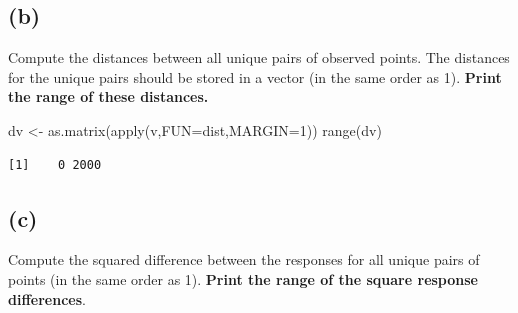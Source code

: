\documentclass[
  letterpaper,
  DIV=11,
  numbers=noendperiod]{scrartcl}
\newenvironment{Shaded}{\begin{snugshade}}{\end{snugshade}}
\newcommand{\AttributeTok}[1]{\textcolor[rgb]{0.40,0.45,0.13}{#1}}
\newcommand{\DecValTok}[1]{\textcolor[rgb]{0.68,0.00,0.00}{#1}}
\newcommand{\FunctionTok}[1]{\textcolor[rgb]{0.28,0.35,0.67}{#1}}
\newcommand{\NormalTok}[1]{\textcolor[rgb]{0.00,0.23,0.31}{#1}}
\newcommand{\OtherTok}[1]{\textcolor[rgb]{0.00,0.23,0.31}{#1}}
\begin{document}
\hypertarget{b-2}{%
\subsection{(b)}\label{b-2}}

Compute the distances between all unique pairs of observed points. The
distances for the unique pairs should be stored in a vector (in the same
order as 1). \textbf{Print the range of these distances.}

\begin{Shaded}
\begin{Highlighting}[]
\NormalTok{dv }\OtherTok{\textless{}{-}} \FunctionTok{as.matrix}\NormalTok{(}\FunctionTok{apply}\NormalTok{(v,}\AttributeTok{FUN=}\NormalTok{dist,}\AttributeTok{MARGIN=}\DecValTok{1}\NormalTok{))}
\FunctionTok{range}\NormalTok{(dv)}
\end{Highlighting}
\end{Shaded}

\begin{verbatim}
[1]    0 2000
\end{verbatim}

\hypertarget{c-2}{%
\subsection{(c)}\label{c-2}}

Compute the squared difference between the responses for all unique
pairs of points (in the same order as 1). \textbf{Print the range of the
square response differences}.
\end{document}
